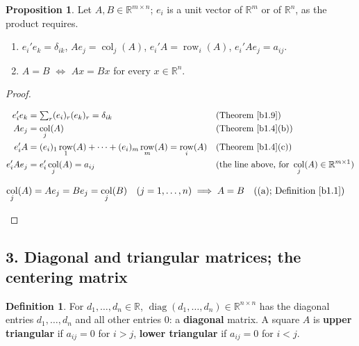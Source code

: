 \documentclass[12pt]{article}
\newcommand{\R}{\mathbb R}
\DeclareMathOperator{\col}{col}
\DeclareMathOperator{\diag}{diag}
\theoremstyle{definition}
\newtheorem{proposition}[theorem]{Proposition}
\newtheorem{definition}[theorem]{Definition}
\newcommand{\boardtop}{\vspace*{-\abovedisplayskip}}
\DeclareMathOperator{\row}{row}
\begin{document}
\begin{proposition}\label{b1.18}
Let \(A,B\in\R^{m\times n}\); \(e_i\) is a unit vector of \(\R^m\) or of \(\R^n\), as the product requires.
\begin{enumerate}
\item \(e_i'e_k=\delta_{ik}\), \(Ae_j=\col_j(A)\), \(e_i'A=\row_i(A)\), \(e_i'Ae_j=a_{ij}\).
\item \(A=B\) \(\iff\) \(Ax=Bx\) for every \(x\in\R^n\).
\end{enumerate}
\end{proposition}
\begin{proof}
\begin{board}[(a) The term \((e_i)_r(e_k)_r\) is \(1\) if \(r=i=k\), \(0\) otherwise:]
\boardtop
\begin{align*}
e_i'e_k&=\textstyle\sum_r(e_i)_r(e_k)_r=\delta_{ik}&&\text{(Theorem~\ref{b1.9})}\\
Ae_j&=\col_j(A)&&\text{(Theorem~\ref{b1.4}(b))}\\
e_i'A&=(e_i)_1\row_1(A)+\dots+(e_i)_m\row_m(A)=\row_i(A)&&\text{(Theorem~\ref{b1.4}(c))}\\
e_i'Ae_j&=e_i'\col_j(A)=a_{ij}&&\text{(the line above, for }\col_j(A)\in\R^{m\times1})
\end{align*}
\end{board}
\begin{board}[(b) \(A=B\Rightarrow Ax=Bx\). Conversely, take \(x=e_j\) (\(j=1,\dots,n\)):]
\boardtop
\begin{align*}
\col_j(A)&=Ae_j=Be_j=\col_j(B)\quad(j=1,\dots,n)\implies A=B&&\text{((a); Definition~\ref{b1.1})}
\end{align*}
\end{board}
\nopagebreak
\end{proof}

\subsection*{3. Diagonal and triangular matrices; the centering matrix}

\begin{definition}\label{b1.12}
For \(d_1,\dots,d_n\in\R\), \(\diag(d_1,\dots,d_n)\in\R^{n\times n}\) has the diagonal entries \(d_1,\dots,d_n\) and all
other entries \(0\): a \textbf{diagonal} matrix. A square \(A\) is \textbf{upper triangular} if \(a_{ij}=0\) for
\(i>j\), \textbf{lower triangular} if \(a_{ij}=0\) for \(i<j\).
\end{definition}
\end{document}
